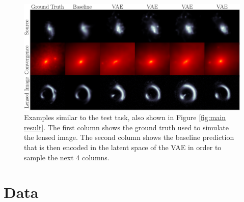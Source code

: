 \begin{figure}[t!]
        \centering
        \includegraphics[width=\linewidth]{figures/vae_samples_similar_to_highlight}
        \caption{Examples similar to the test task, also shown in Figure \ref{fig:main result}. The first column shows the ground truth used to simulate the lensed image. The second column shows the baseline prediction that is then encoded in the latent space of the VAE in order to sample the next 4 columns.
}
        \label{fig:vae fine-tuning}
\end{figure}





\section{Data}\label{sec:data}

